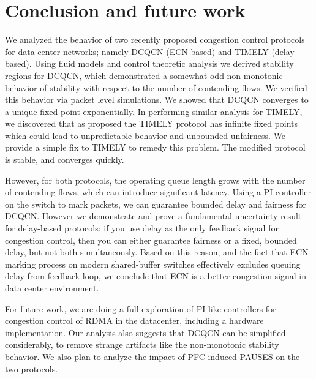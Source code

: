 \vspace{-0.5em}
\section{Conclusion and future work}
We analyzed  the behavior of two recently proposed congestion control protocols
for data center networks; namely DCQCN (ECN based) and TIMELY (delay based).
Using fluid models and control theoretic analysis we derived stability regions
for DCQCN, which demonstrated a somewhat odd non-monotonic behavior of stability
with respect to the number of contending flows. We verified this behavior via
packet level simulations. We showed that DCQCN converges to a unique
fixed point exponentially. In performing similar analysis for TIMELY, we discovered that as proposed
the TIMELY protocol has infinite fixed points which could lead to unpredictable
behavior and unbounded unfairness. We provide a simple fix to TIMELY to remedy
this problem. The modified protocol is stable, and converges quickly.

However, for both protocols, the operating queue length grows with the number of
contending flows, which can introduce significant latency. Using a PI controller
on the switch to mark packets, we can guarantee bounded delay and fairness for
DCQCN.  However we demonstrate and prove a fundamental uncertainty result for
delay-based protocols: if you use delay as the only feedback signal for
congestion control, then you can either guarantee fairness or a fixed,
bounded delay,
but not both simultaneously. Based on this reason, and the fact that ECN marking
process on modern shared-buffer switches effectively excludes queuing delay from
feedback loop, we conclude that ECN is a better congestion signal in data center
environment. 

For future work, we are doing a full exploration of PI like controllers for
congestion control of RDMA in the datacenter, including a hardware
implementation. Our analysis also suggests that DCQCN can be simplified
considerably, to remove strange artifacts like the non-monotonic stability
behavior. We also plan to analyze the impact of PFC-induced PAUSES on the two
protocols.


